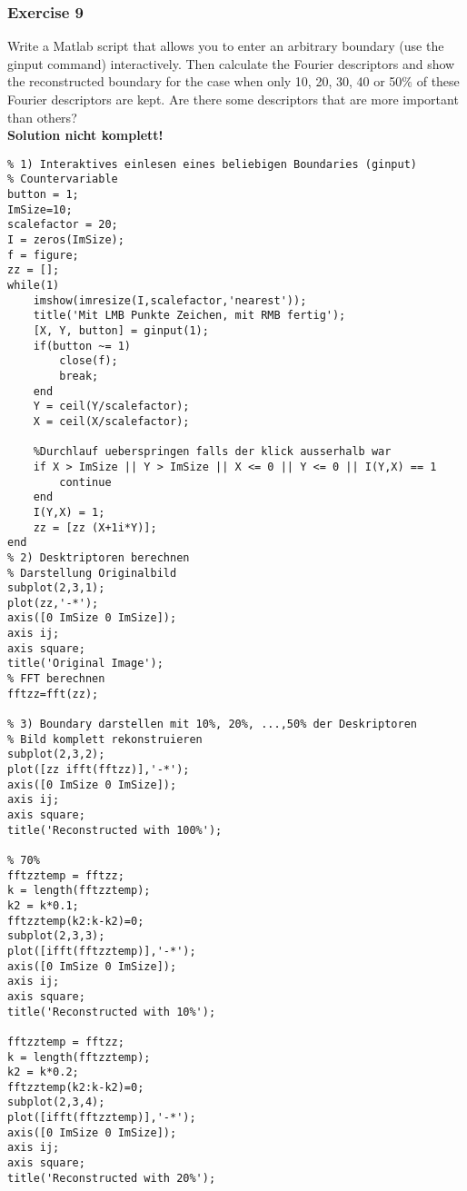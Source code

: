 \subsubsection{Exercise 9}
Write a Matlab script that allows you to enter an arbitrary boundary (use the ginput command) interactively. Then calculate the Fourier descriptors and show the reconstructed boundary for the case when only 10, 20, 30, 40 or 50$\%$ of these Fourier descriptors are kept. Are there some descriptors that are more important than others?\\
\textbf{Solution nicht komplett!}
\begin{lstlisting}
% 1) Interaktives einlesen eines beliebigen Boundaries (ginput)
% Countervariable
button = 1;
ImSize=10;
scalefactor = 20;
I = zeros(ImSize);
f = figure;
zz = [];
while(1)
    imshow(imresize(I,scalefactor,'nearest'));
    title('Mit LMB Punkte Zeichen, mit RMB fertig');
    [X, Y, button] = ginput(1);
    if(button ~= 1)
        close(f);
        break;
    end
    Y = ceil(Y/scalefactor);
    X = ceil(X/scalefactor);
    
    %Durchlauf ueberspringen falls der klick ausserhalb war
    if X > ImSize || Y > ImSize || X <= 0 || Y <= 0 || I(Y,X) == 1
        continue
    end
    I(Y,X) = 1;
    zz = [zz (X+1i*Y)];
end
% 2) Desktriptoren berechnen
% Darstellung Originalbild
subplot(2,3,1);
plot(zz,'-*');
axis([0 ImSize 0 ImSize]);
axis ij;
axis square;
title('Original Image');
% FFT berechnen
fftzz=fft(zz);

% 3) Boundary darstellen mit 10%, 20%, ...,50% der Deskriptoren
% Bild komplett rekonstruieren
subplot(2,3,2);
plot([zz ifft(fftzz)],'-*');
axis([0 ImSize 0 ImSize]);
axis ij;
axis square;
title('Reconstructed with 100%');

% 70%
fftzztemp = fftzz;
k = length(fftzztemp);
k2 = k*0.1;
fftzztemp(k2:k-k2)=0;
subplot(2,3,3);
plot([ifft(fftzztemp)],'-*');
axis([0 ImSize 0 ImSize]);
axis ij;
axis square;
title('Reconstructed with 10%');

fftzztemp = fftzz;
k = length(fftzztemp);
k2 = k*0.2;
fftzztemp(k2:k-k2)=0;
subplot(2,3,4);
plot([ifft(fftzztemp)],'-*');
axis([0 ImSize 0 ImSize]);
axis ij;
axis square;
title('Reconstructed with 20%');
\end{lstlisting}